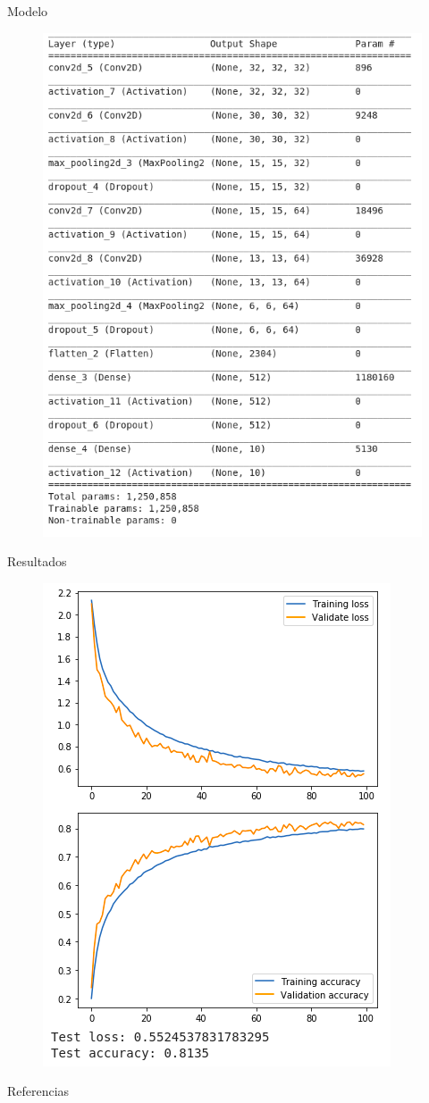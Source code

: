 \documentclass[spanish]{beamer}
\begin{document}
\begin{frame}{Modelo}
  \begin{figure}[h]
    \centering
    \includegraphics[width=.5\textwidth]{img/model}
  \end{figure}
\end{frame}

\begin{frame}{Resultados}
  \begin{figure}[h]
    \centering
    \includegraphics[width=.5\textwidth]{img/graficascifar}
  \end{figure}
\end{frame}

\begin{frame}[t,allowframebreaks]{Referencias}
  \printbibliography[heading=none]
\end{frame}
\end{document}
